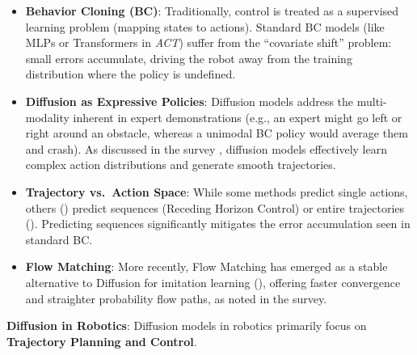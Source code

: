  \begin{itemize}
  \tightlist
  \item
    \textbf{Behavior Cloning (BC)}: Traditionally, control is treated as
    a supervised learning problem (mapping states to actions). Standard
    BC models (like MLPs or Transformers in \emph{ACT}) suffer from the
    ``covariate shift'' problem: small errors accumulate, driving the
    robot away from the training distribution where the policy is
    undefined.
  \item
    \textbf{Diffusion as Expressive Policies}: Diffusion models address
    the multi-modality inherent in expert demonstrations (e.g., an
    expert might go left or right around an obstacle, whereas a unimodal
    BC policy would average them and crash). As discussed in the survey
    \cite{wolf2025diffusion}, diffusion models effectively learn complex
    action distributions and generate smooth trajectories.
  \item
    \textbf{Trajectory vs.~Action Space}: While some methods predict
    single actions, others (\cite{chi2023diffusion}) predict
    sequences (Receding Horizon Control) or entire trajectories (\cite{carvalho2023motion}). Predicting sequences significantly mitigates the error
    accumulation seen in standard BC.
  \item
    \textbf{Flow Matching}: More recently, Flow Matching has emerged as
    a stable alternative to Diffusion for imitation learning (\cite{rouxel2024flow}), offering faster convergence and straighter probability
    flow paths, as noted in the survey.
  \end{itemize}
\item
  \textbf{Diffusion in Robotics}: Diffusion models in robotics primarily
  focus on \textbf{Trajectory Planning and Control}.

